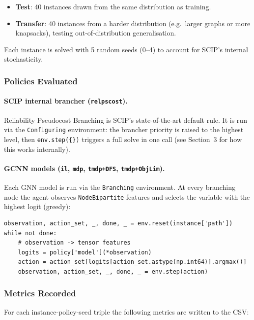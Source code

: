 \begin{itemize}
    \item \textbf{Test}: 40 instances drawn from the same distribution as training.
    \item \textbf{Transfer}: 40 instances from a harder distribution (e.g.\ larger graphs or more knapsacks), testing out-of-distribution generalisation.
\end{itemize}

Each instance is solved with 5 random seeds (0--4) to account for SCIP's internal stochasticity.

\subsubsection{Policies Evaluated}

\paragraph{SCIP internal brancher (\texttt{relpscost}).}
Reliability Pseudocost Branching is SCIP's state-of-the-art default rule. It is run via the \texttt{Configuring} environment: the brancher priority is raised to the highest level, then \texttt{env.step(\{\})} triggers a full solve in one call (see Section~3 for how this works internally).

\paragraph{GCNN models (\texttt{il}, \texttt{mdp}, \texttt{tmdp+DFS}, \texttt{tmdp+ObjLim}).}
Each GNN model is run via the \texttt{Branching} environment. At every branching node the agent observes \texttt{NodeBipartite} features and selects the variable with the highest logit (greedy):

\begin{lstlisting}
observation, action_set, _, done, _ = env.reset(instance['path'])
while not done:
    # observation -> tensor features
    logits = policy['model'](*observation)
    action = action_set[logits[action_set.astype(np.int64)].argmax()]
    observation, action_set, _, done, _ = env.step(action)
\end{lstlisting}

\subsubsection{Metrics Recorded}

For each instance-policy-seed triple the following metrics are written to the CSV:

